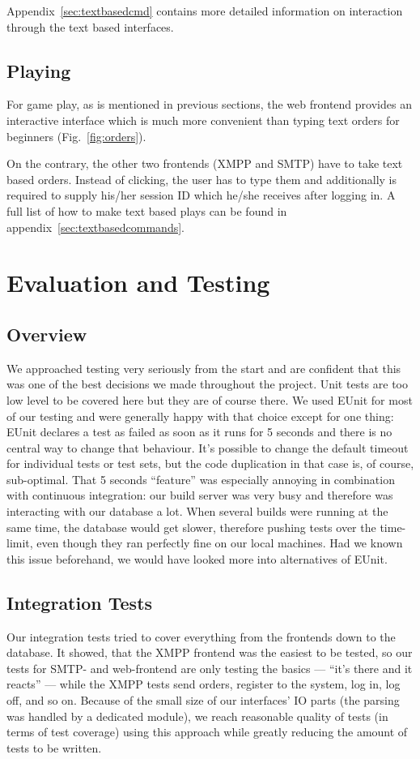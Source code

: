 \documentclass[11pt,a4paper]{report}
\newcommand{\hi}[1]{{\color{red}\em #1\/}\\}
\begin{document}
Appendix~\ref{sec:textbasedcmd} contains more detailed information on
interaction through the text based interfaces.

\section{Playing}
For game play, as is mentioned in previous sections, the web frontend provides
an interactive interface which is much more convenient than typing text orders
for beginners (Fig.~\ref{fig:orders}).

On the contrary, the other two frontends (XMPP and SMTP) have to take text
based orders. Instead of clicking, the user has to type them and additionally
is required to supply his/her session ID which he/she receives after logging in.
A full list of how to make text based plays can be found in
appendix~\ref{sec:textbasedcommands}.

\chapter{Evaluation and Testing}
\section{Overview}
We approached testing very seriously from the start and are confident that this
was one of the best decisions we made throughout the project. Unit tests are too
low level to be covered here but they are of course there. We used EUnit for
most of our testing and were generally happy with that choice except for one
thing: EUnit declares a test as failed as soon as it runs for 5 seconds and
there is no central way to change that behaviour. It's possible to change the
default timeout for individual tests or test sets, but the code duplication in
that case is, of course, sub-optimal.
That 5 seconds ``feature'' was especially annoying in combination with
continuous integration: our build server was very busy and therefore was
interacting with our database a lot. When several builds were running at the
same time, the database would get slower, therefore pushing tests over the
time-limit, even though they ran perfectly fine on our local machines. Had we
known this issue beforehand, we would have looked more into alternatives of
EUnit.

\section{Integration Tests}
Our integration tests tried to cover everything from the frontends down to the
database. It showed, that the XMPP frontend was the easiest to be tested, so
our tests for SMTP- and web-frontend are only testing the basics --- ``it's
there and it reacts'' --- while the XMPP tests send orders, register to the
system, log in, log off, and so on. Because of the small size of our interfaces' IO
parts (the parsing was handled by a dedicated module), we reach reasonable quality
of tests (in terms of test coverage) using this approach while greatly reducing the
amount of tests to be written.
\end{document}
